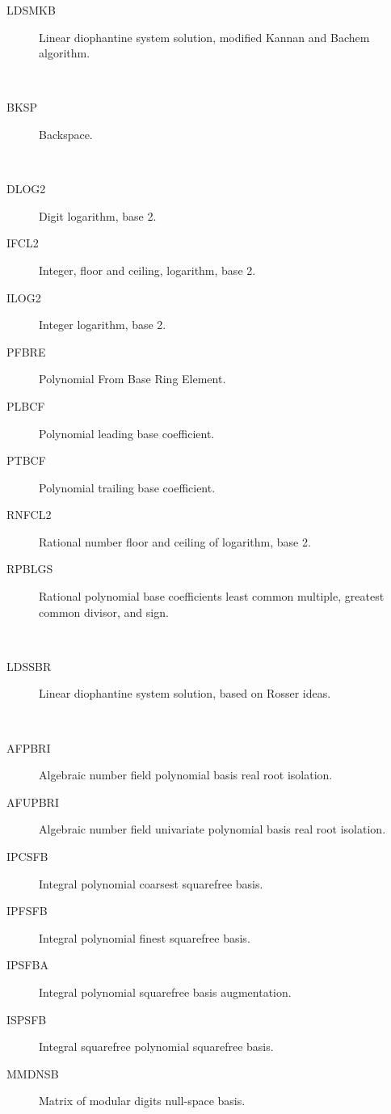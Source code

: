 \begin{description}
\begin{description}
  \item[LDSMKB]  Linear diophantine system solution, modified Kannan and
    Bachem algorithm.
  \end{description}
\item[backspace] \ \ 
  \begin{description}
  \item[BKSP]  Backspace.
  \end{description}
\item[base] \ \ 
  \begin{description}
  \item[DLOG2]  Digit logarithm, base 2.
  \item[IFCL2]  Integer, floor and ceiling, logarithm, base 2.
  \item[ILOG2]  Integer logarithm, base 2.
  \item[PFBRE]  Polynomial From Base Ring Element.
  \item[PLBCF]  Polynomial leading base coefficient.
  \item[PTBCF]  Polynomial trailing base coefficient.
  \item[RNFCL2]  Rational number floor and ceiling of logarithm, base 2.
  \item[RPBLGS]  Rational polynomial base coefficients least common multiple,
    greatest common divisor, and sign.
  \end{description}
\item[based] \ \ 
  \begin{description}
  \item[LDSSBR]  Linear diophantine system solution, based on Rosser ideas.
  \end{description}
\item[basis] \ \ 
  \begin{description}
  \item[AFPBRI]  Algebraic number field polynomial basis real root isolation.
  \item[AFUPBRI]  Algebraic number field univariate polynomial basis real root
    isolation.
  \item[IPCSFB]  Integral polynomial coarsest squarefree basis.
  \item[IPFSFB]  Integral polynomial finest squarefree basis.
  \item[IPSFBA]  Integral polynomial squarefree basis augmentation.
  \item[ISPSFB]  Integral squarefree polynomial squarefree basis.
  \item[MMDNSB]  Matrix of modular digits null-space basis.

\end{description}
\end{description}
